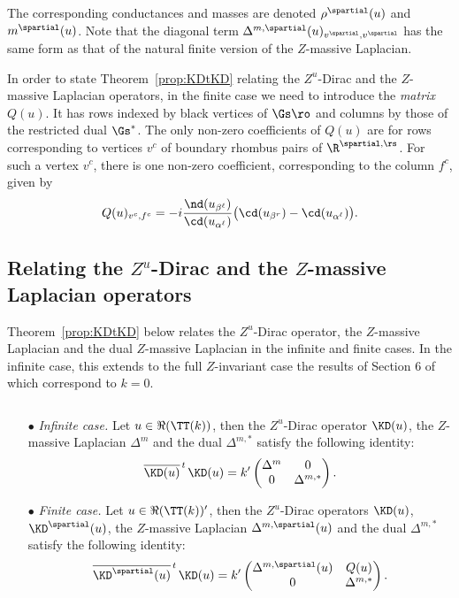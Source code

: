 \documentclass[a4paper,twoside,11pt]{article}
\begin{document}
The corresponding conductances and masses are denoted $\rho^\spartial(u)$ and $m^\spartial(u)$.
Note that the diagonal term $\Delta^{m,\spartial}(u)_{v^\spartial,v^\spartial}$ has the same form as that of the natural 
finite version of the $Z$-massive Laplacian.


In order to state Theorem~\ref{prop:KDtKD} relating the $Z^u$-Dirac and the $Z$-massive Laplacian operators, in the finite case we 
need to introduce the \emph{matrix $Q(u)$}. It has rows indexed by black vertices of $\Gs\ro$ and columns by 
those of the restricted dual $\Gs^*$. 
The only non-zero coefficients of $Q(u)$ are for rows corresponding to vertices $v^c$ of boundary rhombus pairs of $\R^{\spartial,\rs}$.
For such a vertex $v^c$, 
there is one non-zero coefficient, corresponding to the column $f^c$, given by
\[
Q(u)_{v^c,f^c}=-i\frac{\nd(u_{\beta^\ell})}{\cd(u_{\alpha^\ell})}\bigl(\cd(u_{\beta^r})-\cd(u_{\alpha^\ell})\bigr).
\]



\subsection{Relating the $Z^u$-Dirac and the $Z$-massive Laplacian operators}\label{sec:KD_Lap_mas}

Theorem~\ref{prop:KDtKD} below relates the $Z^u$-Dirac operator, the $Z$-massive Laplacian and the dual $Z$-massive Laplacian in the infinite
and finite cases. In the infinite case, this extends to the full $Z$-invariant case the results of Section 6 of~\cite{Kenyon3} which correspond to $k=0$.

\begin{thm}\label{prop:KDtKD}$\,$
\begin{itemize}
 \item[$\bullet$] \emph{Infinite case.} Let $u\in\Re(\TT(k))$, then the $Z^u$-Dirac operator $\KD(u)$, the $Z$-massive Laplacian 
 $\Delta^m$ and the dual 
 $\Delta^{m,*}$ satisfy the following identity:
\begin{equation*} 
\overline{\KD(u)}^{\,t\,}\KD(u)=k'
\begin{pmatrix}
\Delta^m&0\\
0&\Delta^{m,*}
\end{pmatrix}.
\end{equation*}\item[$\bullet$] \emph{Finite case.} Let $u\in\Re(\TT(k))'$, then the $Z^u$-Dirac operators $\KD(u)$, $\KD^\spartial(u)$, 
the $Z$-massive Laplacian
$\Delta^{m,\spartial}(u)$ and the dual $\Delta^{m,*}$ satisfy the following identity:
\begin{equation*} 
\overline{\KD^\spartial(u)}^{\,t\,}\KD(u)=k'
\begin{pmatrix}
\Delta^{m,\spartial}(u)& Q(u)\\
0&\Delta^{m,*}
\end{pmatrix}.
\end{equation*}
\end{itemize}
\end{thm}
\end{document}
